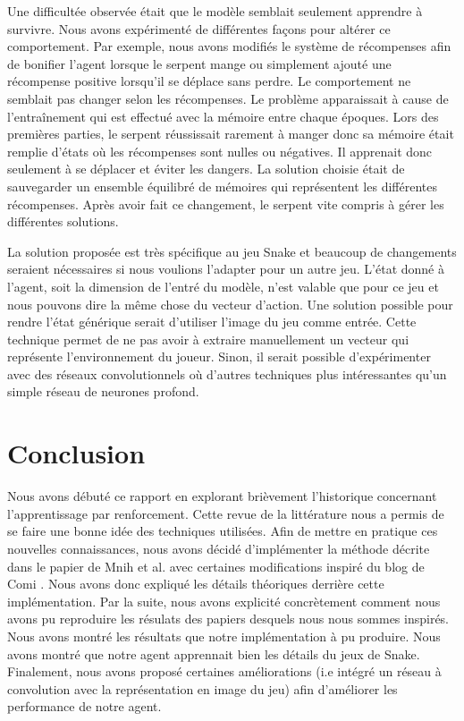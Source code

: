 \documentclass{article}
\begin{document}
Une difficultée observée était que le modèle semblait seulement apprendre à survivre. Nous avons expérimenté de différentes façons pour altérer ce comportement. Par exemple, nous avons modifiés le système de récompenses afin de bonifier l’agent lorsque le serpent mange ou simplement ajouté une récompense positive lorsqu’il se déplace sans perdre. Le comportement ne semblait pas changer selon les récompenses. Le problème apparaissait à cause de l’entraînement qui est effectué avec la mémoire entre chaque époques. Lors des premières parties, le serpent réussissait rarement à manger donc sa mémoire était remplie d’états où les récompenses sont nulles ou négatives. Il apprenait donc seulement à se déplacer et éviter les dangers. La solution choisie était de sauvegarder un ensemble équilibré de mémoires qui représentent les différentes récompenses. Après avoir fait ce changement, le serpent vite compris à gérer les différentes solutions.

La solution proposée est très spécifique au jeu Snake et beaucoup de changements seraient nécessaires si nous voulions l’adapter pour un autre jeu. L’état donné à l’agent, soit la dimension de l’entré du modèle, n’est valable que pour ce jeu et nous pouvons dire la même chose du vecteur d’action. Une solution possible pour rendre l’état générique serait d’utiliser l’image du jeu comme entrée. Cette technique permet de ne pas avoir à extraire manuellement un vecteur qui représente l’environnement du joueur. Sinon, il serait possible d’expérimenter avec des réseaux convolutionnels où d’autres techniques plus intéressantes qu’un simple réseau de neurones profond.

\section{Conclusion}

Nous avons débuté ce rapport en explorant brièvement l'historique concernant l'apprentissage par renforcement. Cette revue de la littérature nous a permis de se faire une bonne idée des techniques utilisées. Afin de mettre en pratique ces nouvelles connaissances, nous avons décidé d'implémenter la méthode décrite dans le papier de Mnih et al. \cite{DBLP:journals/corr/MnihKSGAWR13} avec certaines modifications inspiré du blog de Comi \cite{comi_2020}. Nous avons donc expliqué les détails théoriques derrière cette implémentation. Par la suite, nous avons explicité concrètement comment nous avons pu reproduire les résulats des papiers desquels nous nous sommes inspirés. Nous avons montré les résultats que notre implémentation à pu produire. Nous avons montré que notre agent apprennait bien les détails du jeux de Snake. Finalement, nous avons proposé certaines améliorations (i.e intégré un réseau à convolution avec la représentation en image du jeu) afin d'améliorer les performance de notre agent. 

\printbibliography
\end{document}
